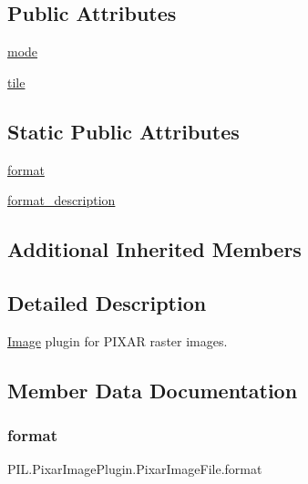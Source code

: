 \subsection*{Public Attributes}
\begin{DoxyCompactItemize}
\item 
\hyperlink{classPIL_1_1PixarImagePlugin_1_1PixarImageFile_af007639ebc62abf160fdcb4bfd40abe8}{mode}
\item 
\hyperlink{classPIL_1_1PixarImagePlugin_1_1PixarImageFile_ac080759c07e6935375719850ed1cd71b}{tile}
\end{DoxyCompactItemize}
\subsection*{Static Public Attributes}
\begin{DoxyCompactItemize}
\item 
\hyperlink{classPIL_1_1PixarImagePlugin_1_1PixarImageFile_a5e7773a8ad808caac50f4218a38c6966}{format}
\item 
\hyperlink{classPIL_1_1PixarImagePlugin_1_1PixarImageFile_a7668249d8898ec9f3b46f618b9b987c4}{format\+\_\+description}
\end{DoxyCompactItemize}
\subsection*{Additional Inherited Members}


\subsection{Detailed Description}
\hyperlink{namespacePIL_1_1Image}{Image} plugin for P\+I\+X\+AR raster images. 



\subsection{Member Data Documentation}
\mbox{\label{classPIL_1_1PixarImagePlugin_1_1PixarImageFile_a5e7773a8ad808caac50f4218a38c6966}} 
\subsubsection{\texorpdfstring{format}{format}}
{\footnotesize\ttfamily P\+I\+L.\+Pixar\+Image\+Plugin.\+Pixar\+Image\+File.\+format\hspace{0.3cm}{\ttfamily [static]}}

